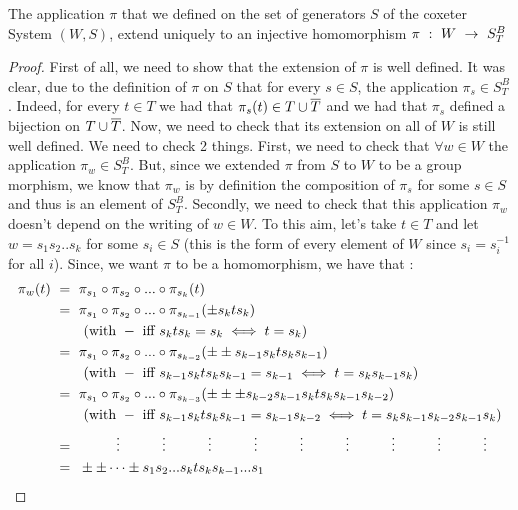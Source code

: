 
	\begin{theorem}
		The application $\pi$ that we defined on the set of generators $S$ of the coxeter System $(W,S)$, extend uniquely to an injective homomorphism $\pi\text{ }:\text{ } W\text{ }\rightarrow\text{ } S^B_T$
	\end{theorem}
	\begin{proof}
		First of all, we need to show that the extension of $\pi$ is well defined. It was clear, due to the definition of $\pi$ on $S$ that for every $s\in S$, the application $\pi_s\in S^B_T$. Indeed, for every $t\in T$ we had that $\pi_s(t)\in T\cup \overline{T}$ and we had that $\pi_s$ defined a bijection on $T\cup \overline{T}$. Now, we need to check that its extension on all of $W$ is still well defined. We need to check 2 things. First, we need to check that $\forall w\in W$ the application $\pi_w\in S_T^B$. But, since we extended $\pi$ from $S$ to $W$ to be a group morphism, we know that $\pi_w$ is by definition the composition of $\pi_s$ for some $s\in S$ and thus is an element of $S_T^B$. Secondly, we need to check that this application $\pi_w$ doesn't depend on the writing of $w\in W$. To this aim, let's take $t\in T$ and let $w=s_1s_2..s_k$ for some $s_i\in S$ (this is the form of every element of $W$ since $s_i=s_i^{-1}$ for all $i$). Since, we want $\pi$ to be a homomorphism, we have that :
		\begin{equation}\label{equation donnant la form explicite de pi}
		\begin{split}
		\pi_w(t)\qq&=\qq \pi_{s_1}\circ\pi_{s_2}\circ ... \circ \pi_{s_k}(t)\\
		&=\qq \pi_{s_1}\circ\pi_{s_2}\circ ... \circ \pi_{s_{k-1}}(\pm s_kts_k)\q\q\\
		& \q\q (\mbox{with }-\mbox{ iff }s_kts_k=s_k\iff t=s_k)\\
		&=\qq \pi_{s_1}\circ\pi_{s_2}\circ ... \circ \pi_{s_{k-2}}(\pm\pm s_{k-1}s_kts_ks_{k-1})\q\q\\
		& \q\q(\mbox{with }-\mbox{ iff }s_{k-1}s_kts_ks_{k-1}=s_{k-1}\iff t=s_ks_{k-1}s_k)\\
		&=\qq \pi_{s_1}\circ\pi_{s_2}\circ ... \circ \pi_{s_{k-3}}(\pm\pm\pm s_{k-2}s_{k-1}s_kts_ks_{k-1}s_{k-2})\q\q \\
		&\q\q (\mbox{with }-\mbox{ iff }s_{k-1}s_kts_ks_{k-1}=s_{k-1}s_{k-2}\iff t=s_ks_{k-1}s_{k-2}s_{k-1}s_k)\\
		&=\q\q \q\vdots\q\q \q\vdots\q\q \q\vdots\q\q \q\vdots\q\q \q\vdots\q\q \q\vdots\q\q \q\vdots\q\q \q\vdots\q\q \q\vdots\\
		&=\qq \pm\pm \dots \pm s_1s_2...s_kts_ks_{k-1}... s_1\q\q\\

\end{split}
\end{equation}
\end{proof}
